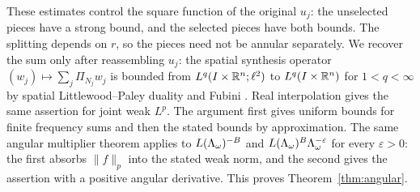 These estimates control the square function of the original $u_j$:
the unselected pieces have a strong bound, and the selected pieces
have both bounds. The splitting depends on $r$, so the pieces need not
be annular separately. We recover the sum only after reassembling $u_j$:
the spatial synthesis operator
$(w_j)\mapsto\sum_j\Pi_{N_j}w_j$ is bounded from
$L^q(I\times\mathbb R^n;\ell^2)$ to $L^q(I\times\mathbb R^n)$ for $1<q<\infty$
by spatial Littlewood--Paley duality and Fubini
\cite[Theorem~6.1.2 and Remark~6.1.3]{Grafakos2014}. Real interpolation
gives the same assertion for joint weak $L^p$. The argument
first gives uniform bounds for finite frequency sums and then the
stated bounds by approximation. The same angular multiplier theorem
applies to $L(\Lambda_\omega)^{-B}$ and $L(\Lambda_\omega)^B\Lambda_\omega^{-\varepsilon}$ for every
$\varepsilon>0$: the first absorbs $\|f\|_p$ into the stated weak norm,
and the second gives the assertion with a positive angular derivative.
This proves Theorem~\ref{thm:angular}.
